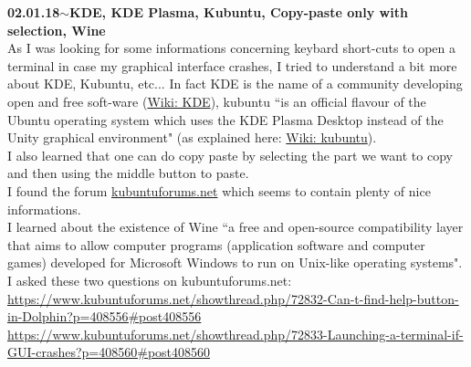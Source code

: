 \documentclass[11pt,a4paper]{article}
\newenvironment{loggentry}[2]%
{\noindent\textbf{#1}\hspace{1cm}$\mathbf{\sim}$\text{ }\textbf{#2}\\}{\vspace{0.5cm}}
\begin{document}
\begin{loggentry}{02.01.18}{KDE, KDE Plasma, Kubuntu, Copy-paste only with selection, Wine}
As I was looking for some informations concerning keybard short-cuts to open a terminal in case my graphical interface crashes, I tried to understand a bit more about KDE, Kubuntu, etc... In fact KDE is the name of a community developing open and free soft-ware (\href{https://en.wikipedia.org/wiki/KDE}{Wiki: KDE}), kubuntu ``is an official flavour of the Ubuntu operating system which uses the KDE Plasma Desktop instead of the Unity graphical environment" (as explained here: \href{https://en.wikipedia.org/wiki/Kubuntu}{Wiki: kubuntu}).\\
I also learned that one can do copy paste by selecting the part we want to copy and then using the middle button to paste.\\
I found the forum \href{https://www.kubuntuforums.net/forum.php}{kubuntuforums.net} which seems to contain plenty of nice informations.\\
I learned about the existence of Wine ``a free and open-source compatibility layer that aims to allow computer programs (application software and computer games) developed for Microsoft Windows to run on Unix-like operating systems".\\
I asked these two questions on kubuntuforums.net:\\
\url{https://www.kubuntuforums.net/showthread.php/72832-Can-t-find-help-button-in-Dolphin?p=408556#post408556}\\
\url{https://www.kubuntuforums.net/showthread.php/72833-Launching-a-terminal-if-GUI-crashes?p=408560#post408560}
\end{loggentry}
\end{document}
